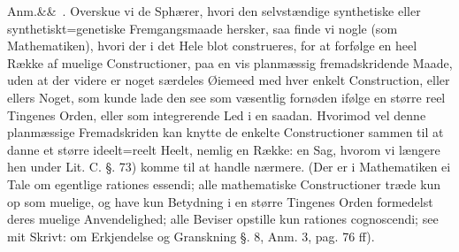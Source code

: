 \documentclass[12pt]{book}
\def\sperr#1{#1}%
\def\textit#1{#1}%
\newcommand{\sperr}[1]{\textls[180]{#1}}
\newcommand{\anm}[1]{%
  \par\vspace{0.5\baselineskip}%
  \noindent\hspace{\parindent}\sperr{Anm.}\ifx&#1&\else~\textit{#1}.\fi
  \enspace\ignorespaces
}
\newcommand{\opage}[1]{\marginnote{\footnotesize\textit{[#1]}}}
\begin{document}
\anm{} Overskue vi de Sphærer, hvori den selvstændige synthetiske eller
synthetiskt=genetiske Fremgangsmaade hersker, saa finde vi nogle (som
Mathematiken), hvori der i det Hele blot construeres, for at forfølge en heel
Række af muelige Constructioner, paa en vis planmæssig fremadskridende Maade,
uden at der videre er noget
\opage{170} særdeles Øiemeed med hver enkelt Construction, eller ellers Noget, som kunde
lade den see som væsentlig fornøden ifølge en større reel Tingenes Orden, eller
som integrerende Led i en saadan. Hvorimod vel denne planmæssige Fremadskriden
kan knytte de enkelte Constructioner sammen til at danne et større ideelt=reelt
Heelt, nemlig en Række: en Sag, hvorom vi længere hen under Lit. \textit{C}.
§. 73) komme til at handle nærmere.
(Der er i Mathematiken ei Tale om egentlige \textit{rationes essendi}; alle
mathematiske Constructioner træde kun op som muelige, og have kun Betydning i
en større Tingenes Orden formedelst deres muelige Anvendelighed; alle Beviser
opstille kun \textit{rationes cognoscendi}; see mit Skrivt: om Erkjendelse og
Granskning §. 8, Anm. 3, pag. 76 ff).
\end{document}
